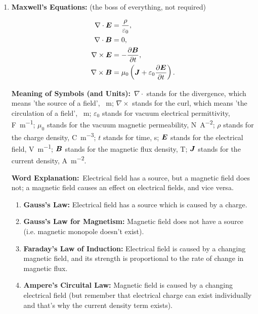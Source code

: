\documentclass[8pt]{article}
\newcommand{\MeanSymb}{\textbf{Meaning of Symbols (and Units):}\ }
\newcommand{\WordExpl}{\textbf{Word Explanation:}\ }
\newcommand{\Note}{\textbf{Note:}\ }
\begin{document}
\begin{enumerate}
                \Note It represents the directional energy flux (the energy transfer per unit area per unit time), and demonstrates why an electromagnetic wave is a transverse wave. 
                
                \item \textbf{Maxwell's Equations:} (the boss of everything, not required)
                
                \begin{align*}
                    \nabla \cdot \boldsymbol{E} &= \frac{\rho}{\varepsilon_0},\\
                    \nabla \cdot \boldsymbol{B} &= 0,\\
                    \nabla \times \boldsymbol{E} &= - \frac{\partial \boldsymbol{B}}{\partial t},\\
                    \nabla \times \boldsymbol{B} &= \mu_0 \left(\boldsymbol{J} + \varepsilon_0 \frac{\partial \boldsymbol{E}}{\partial t}\right).
                \end{align*}

                \MeanSymb \(\nabla \cdot\) stands for the divergence, which means 'the source of a field', \unit{\per\metre}; \(\nabla \times\) stands for the curl, which means 'the circulation of a field', \unit{\per\metre}; \(\varepsilon_0\) stands for vacuum electrical permittivity, \unit{\farad\per\metre}; \(\mu_0\) stands for the vacuum magnetic permeability, \unit{\newton \per \ampere \squared}; \(\rho\) stands for the charge density, \unit{\coulomb\per\metre\cubed}; \(t\) stands for time, \unit{\second}; \(\boldsymbol{E}\) stands for the electrical field, \unit{\volt\per\metre}; \(\boldsymbol{B}\) stands for the magnetic flux density, \unit{\tesla}; \(\boldsymbol{J}\) stands for the current density, \unit{\ampere\per\metre\squared}.

                \WordExpl Electrical field has a source, but a magnetic field does not; a magnetic field causes an effect on electrical fields, and vice versa.
                \begin{enumerate}
                    \item \textbf{Gauss's Law:} Electrical field has a source which is caused by a charge.
                    \item \textbf{Gauss's Law for Magnetism:} Magnetic field does not have a source (i.e. magnetic monopole doesn't exist).
                    \item \textbf{Faraday's Law of Induction:} Electrical field is caused by a changing magnetic field, and its strength is proportional to the rate of change in magnetic flux.
                    \item \textbf{Ampere's Circuital Law:} Magnetic field is caused by a changing electrical field (but remember that electrical charge can exist individually and that's why the current density term exists).
                \end{enumerate}


\end{enumerate}
\end{document}
